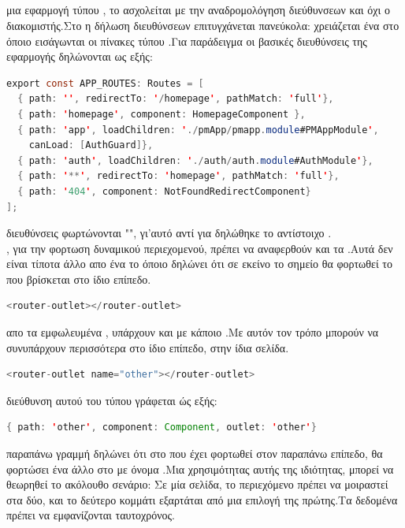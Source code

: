 \subsection*{}
 μια εφαρμογή τύπου , το  ασχολείται με την αναδρομολόγηση διεύθυνσεων και όχι ο διακομιστής.Στο  η δήλωση διευθύνσεων επιτυγχάνεται πανεύκολα: χρειάζεται ένα  στο όποιο εισάγωνται οι πίνακες τύπου .Για παράδειγμα οι βασικές διευθύνσεις της εφαρμογής  δηλώνονται ως εξής:\\
	\begin{lstlisting}[language=Java]
export const APP_ROUTES: Routes = [
  { path: '', redirectTo: '/homepage', pathMatch: 'full'},
  { path: 'homepage', component: HomepageComponent },
  { path: 'app', loadChildren: './pmApp/pmapp.module#PMAppModule',
  	canLoad: [AuthGuard]},
  { path: 'auth', loadChildren: './auth/auth.module#AuthModule'},
  { path: '**', redirectTo: 'homepage', pathMatch: 'full'},
  { path: '404', component: NotFoundRedirectComponent}
];
	\end{lstlisting}
 διευθύνσεις  φωρτώνονται "", γι'αυτό αντί για  δηλώθηκε το αντίστοιχο .\\
, για την φορτωση δυναμικού περιεχομενού, πρέπει να αναφερθούν και τα .Αυτά δεν είναι τίποτα άλλο απο ένα  το όποιο δηλώνει ότι σε εκείνο το σημείο θα φορτωθεί το  που βρίσκεται στο ίδιο επίπεδο.
	\begin{lstlisting}[language=Java]
	<router-outlet></router-outlet>
	\end{lstlisting}
 απο τα εμφωλευμένα , υπάρχουν και  με κάποιο .Με αυτόν τον τρόπο μπορούν να συνυπάρχουν περισσότερα  στο ίδιο επίπεδο, στην ίδια σελίδα.
	\begin{lstlisting}[language=Java]
	<router-outlet name="other"></router-outlet>
	\end{lstlisting}
 διεύθυνση αυτού του τύπου  γράφεται ώς εξής:\\
	\begin{lstlisting}[language=Java]
{ path: 'other', component: Component, outlet: 'other'}
	\end{lstlisting}
 παραπάνω γραμμή δηλώνει ότι στο  που έχει φορτωθεί στον παραπάνω επίπεδο, θα φορτώσει ένα άλλο στο  με όνομα .Μια χρησιμότητας αυτής της ιδιότητας, μπορεί να θεωρηθεί το ακόλουθο σενάριο: Σε μία σελίδα, το περιεχόμενο πρέπει να μοιραστεί στα δύο, και το δεύτερο κομμάτι εξαρτάται από μια επιλογή της πρώτης.Τα δεδομένα πρέπει να εμφανίζονται ταυτοχρόνος.

